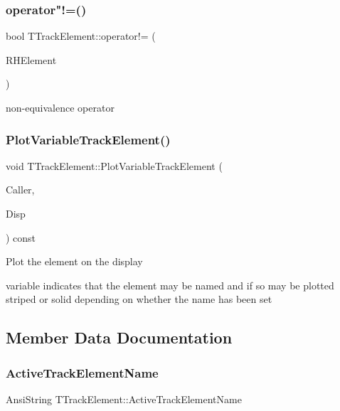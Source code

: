 \subsubsection{\texorpdfstring{operator"!=()}{operator!=()}}
{\footnotesize\ttfamily bool T\+Track\+Element\+::operator!= (\begin{DoxyParamCaption}\item[{\mbox{\hyperlink{class_t_track_element}{T\+Track\+Element}}}]{R\+H\+Element }\end{DoxyParamCaption})}

non-\/equivalence operator \mbox{\label{class_t_track_element_a453377f8db5e108cb274464333e1100f}} 
\subsubsection{\texorpdfstring{Plot\+Variable\+Track\+Element()}{PlotVariableTrackElement()}}
{\footnotesize\ttfamily void T\+Track\+Element\+::\+Plot\+Variable\+Track\+Element (\begin{DoxyParamCaption}\item[{int}]{Caller,  }\item[{\mbox{\hyperlink{class_t_display}{T\+Display}} $\ast$}]{Disp }\end{DoxyParamCaption}) const}

Plot the element on the display

\textquotesingle{}variable\textquotesingle{} indicates that the element may be named and if so may be plotted striped or solid depending on whether the name has been set 

\subsection{Member Data Documentation}
\mbox{\label{class_t_track_element_aa74717ece7b257122688b6f5855d6125}} 
\subsubsection{\texorpdfstring{Active\+Track\+Element\+Name}{ActiveTrackElementName}}
{\footnotesize\ttfamily Ansi\+String T\+Track\+Element\+::\+Active\+Track\+Element\+Name}

